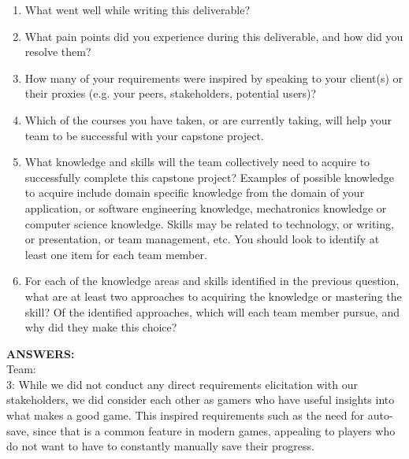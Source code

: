 \documentclass{article}
\begin{document}
\begin{enumerate}
  \item What went well while writing this deliverable? 
  \item What pain points did you experience during this deliverable, and how did
  you resolve them?
  \item How many of your requirements were inspired by speaking to your
  client(s) or their proxies (e.g. your peers, stakeholders, potential users)?
  \item Which of the courses you have taken, or are currently taking, will help
  your team to be successful with your capstone project.
  \item What knowledge and skills will the team collectively need to acquire to
  successfully complete this capstone project?  Examples of possible knowledge
  to acquire include domain specific knowledge from the domain of your
  application, or software engineering knowledge, mechatronics knowledge or
  computer science knowledge.  Skills may be related to technology, or writing,
  or presentation, or team management, etc.  You should look to identify at
  least one item for each team member.
  \item For each of the knowledge areas and skills identified in the previous
  question, what are at least two approaches to acquiring the knowledge or
  mastering the skill?  Of the identified approaches, which will each team
  member pursue, and why did they make this choice?
\end{enumerate}

\textbf{ANSWERS:}\\


Team:\\

3: While we did not conduct any direct requirements elicitation with our stakeholders, we did consider each other as gamers who have useful insights into what makes a good game. This inspired requirements such as the need for auto-save, since that is a common feature in modern games, appealing to players who do not want to have to constantly manually save their progress.\\
\end{document}
